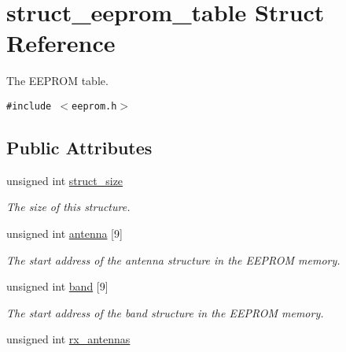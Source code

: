 \hypertarget{structstruct__eeprom__table}{
\section{struct\_\-eeprom\_\-table Struct Reference}
\label{structstruct__eeprom__table}
}
The EEPROM table.  


{\tt \#include $<$eeprom.h$>$}

\subsection*{Public Attributes}
\begin{CompactItemize}
\item 
\hypertarget{structstruct__eeprom__table_ff26dcb858a03ffd4db8ef07e917836d}{
unsigned int \hyperlink{structstruct__eeprom__table_ff26dcb858a03ffd4db8ef07e917836d}{struct\_\-size}}
\label{structstruct__eeprom__table_ff26dcb858a03ffd4db8ef07e917836d}

\begin{CompactList}\small\item\em The size of this structure. \item\end{CompactList}\item 
\hypertarget{structstruct__eeprom__table_2e3d9b78f29f5abcfbeb155d03abd383}{
unsigned int \hyperlink{structstruct__eeprom__table_2e3d9b78f29f5abcfbeb155d03abd383}{antenna} \mbox{[}9\mbox{]}}
\label{structstruct__eeprom__table_2e3d9b78f29f5abcfbeb155d03abd383}

\begin{CompactList}\small\item\em The start address of the antenna structure in the EEPROM memory. \item\end{CompactList}\item 
\hypertarget{structstruct__eeprom__table_969c52f2bed0d41c06a2eba0d635858d}{
unsigned int \hyperlink{structstruct__eeprom__table_969c52f2bed0d41c06a2eba0d635858d}{band} \mbox{[}9\mbox{]}}
\label{structstruct__eeprom__table_969c52f2bed0d41c06a2eba0d635858d}

\begin{CompactList}\small\item\em The start address of the band structure in the EEPROM memory. \item\end{CompactList}\item 
\hypertarget{structstruct__eeprom__table_1fe1fa1b9fccd59ef755085c456e8f7c}{
unsigned int \hyperlink{structstruct__eeprom__table_1fe1fa1b9fccd59ef755085c456e8f7c}{rx\_\-antennas}}
\label{structstruct__eeprom__table_1fe1fa1b9fccd59ef755085c456e8f7c}


\end{CompactItemize}
